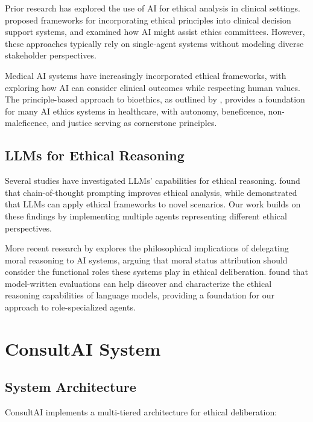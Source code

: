 \documentclass[11pt]{article}
\begin{document}
Prior research has explored the use of AI for ethical analysis in clinical settings. \citet{mittelstadt2019principles} proposed frameworks for incorporating ethical principles into clinical decision support systems, and \citet{biller2021ethical} examined how AI might assist ethics committees. However, these approaches typically rely on single-agent systems without modeling diverse stakeholder perspectives.

Medical AI systems have increasingly incorporated ethical frameworks, with \citet{guan2023medical} exploring how AI can consider clinical outcomes while respecting human values. The principle-based approach to bioethics, as outlined by \citet{beauchamp2001principles}, provides a foundation for many AI ethics systems in healthcare, with autonomy, beneficence, non-maleficence, and justice serving as cornerstone principles.

\subsection{LLMs for Ethical Reasoning}

Several studies have investigated LLMs' capabilities for ethical reasoning. \citet{bang2023multiturn} found that chain-of-thought prompting improves ethical analysis, while \citet{jiang2021can} demonstrated that LLMs can apply ethical frameworks to novel scenarios. Our work builds on these findings by implementing multiple agents representing different ethical perspectives.

More recent research by \citet{schwitzgebel2023computers} explores the philosophical implications of delegating moral reasoning to AI systems, arguing that moral status attribution should consider the functional roles these systems play in ethical deliberation. \citet{perez2022discovering} found that model-written evaluations can help discover and characterize the ethical reasoning capabilities of language models, providing a foundation for our approach to role-specialized agents.

\section{ConsultAI System}

\subsection{System Architecture}

ConsultAI implements a multi-tiered architecture for ethical deliberation:
\end{document}
